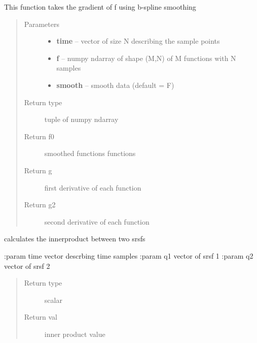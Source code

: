 \documentclass[letterpaper,10pt,english]{sphinxmanual}
\begin{document}

\begin{fulllineitems}
\label{utility_functions:utility_functions.gradient_spline}
This function takes the gradient of f using b-spline smoothing
\begin{quote}\begin{description}
\item[{Parameters}] \leavevmode\begin{itemize}
\item {} 
\textbf{time} -- vector of size N describing the sample points

\item {} 
\textbf{f} -- numpy ndarray of shape (M,N) of M functions with N samples

\item {} 
\textbf{smooth} -- smooth data (default = F)

\end{itemize}

\item[{Return type}] \leavevmode
tuple of numpy ndarray

\item[{Return f0}] \leavevmode
smoothed functions functions

\item[{Return g}] \leavevmode
first derivative of each function

\item[{Return g2}] \leavevmode
second derivative of each function

\end{description}\end{quote}

\end{fulllineitems}


\begin{fulllineitems}
\label{utility_functions:utility_functions.innerprod_q}
calculates the innerproduct between two srsfs

:param time vector descrbing time samples
:param q1 vector of srsf 1
:param q2 vector of srsf 2
\begin{quote}\begin{description}
\item[{Return type}] \leavevmode
scalar

\item[{Return val}] \leavevmode
inner product value

\end{description}\end{quote}

\end{fulllineitems}
\end{document}

